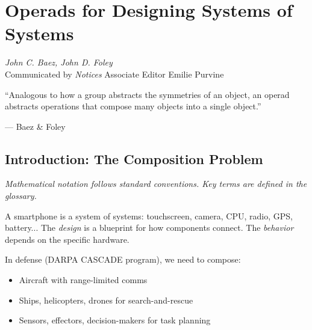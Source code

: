 \chapter{Operads for Designing Systems of Systems}
\label{ch:operads}
\cite{baez2021operads}

\begin{flushright}
\textit{John C. Baez, John D. Foley}\\
Communicated by \textit{Notices} Associate Editor Emilie Purvine
\end{flushright}

\epigraph{``Analogous to how a group abstracts the symmetries of an object, an operad abstracts operations that compose many objects into a single object.''}{--- Baez \& Foley} \cite{baez2021operads}

\begin{abstract}
``Systems of systems'' engineering composes independent systems (radar, comms, weapons, sensors) into a larger capability. This chapter introduces \textbf{operads}---a categorical tool that formalizes the \emph{syntax} of composition (how things plug together) and their \emph{algebras} (the concrete semantics). Applied to network design, search-and-rescue planning, and task coordination, \cite{baez2021operads}.
\end{abstract}

\section{Introduction: The Composition Problem}

\noindent\textit{Mathematical notation follows standard conventions. Key terms are defined in the glossary.}\n
\label{sec:op:intro}

A smartphone is a system of systems: touchscreen, camera, CPU, radio, GPS, battery... The \emph{design} is a blueprint for how components connect. The \emph{behavior} depends on the specific hardware.

In defense (DARPA CASCADE program), we need to compose:
\begin{itemize}
    \item Aircraft with range-limited comms
    \item Ships, helicopters, drones for search-and-rescue
    \item Sensors, effectors, decision-makers for task planning
\end{itemize}

